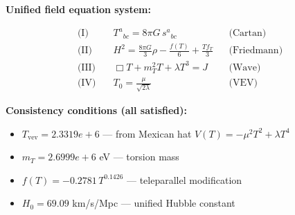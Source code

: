 
\textbf{Unified field equation system:}

\begin{align}
  \text{(I)} \quad & T^a{}_{bc} = 8\pi G \, s^a{}_{bc} && \text{(Cartan)} \\
  \text{(II)} \quad & H^2 = \frac{8\pi G}{3}\rho - \frac{f(T)}{6} + \frac{Tf_T}{3} && \text{(Friedmann)} \\
  \text{(III)} \quad & \Box T + m_T^2 T + \lambda T^3 = J && \text{(Wave)} \\
  \text{(IV)} \quad & T_0 = \frac{\mu}{\sqrt{2\lambda}} && \text{(VEV)}
\end{align}

\textbf{Consistency conditions (all satisfied):}
\begin{itemize}
  \item $T_{\text{vev}} = 2.3319e+6$ — from Mexican hat $V(T) = -\mu^2 T^2 + \lambda T^4$
  \item $m_T = 2.6999e+6$ eV — torsion mass
  \item $f(T) = -0.2781 \, T^{0.1426}$ — teleparallel modification
  \item $H_0 = 69.09$ km/s/Mpc — unified Hubble constant
\end{itemize}